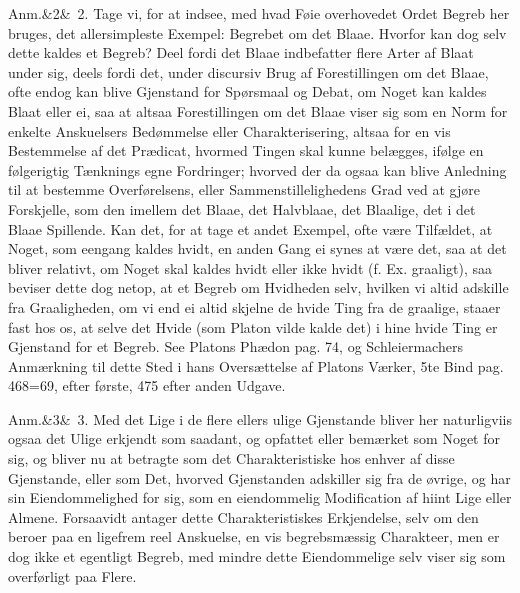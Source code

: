 \documentclass[12pt]{book}
\def\sperr#1{#1}%
\def\textit#1{#1}%
\def\emph#1{#1}%
\newcommand{\sperr}[1]{\textls[180]{#1}}
\newcommand{\anm}[1]{%
  \par\vspace{0.5\baselineskip}%
  \noindent\hspace{\parindent}\sperr{Anm.}\ifx&#1&\else~\textit{#1}.\fi
  \enspace\ignorespaces
}
\newcommand{\opage}[1]{\marginnote{\footnotesize\textit{[#1]}}}
\begin{document}
\anm{2} Tage vi, for at indsee, med hvad Føie overhovedet Ordet Begreb her bruges,
det allersimpleste Exempel: Begrebet om det Blaae. Hvorfor kan dog selv dette kaldes
et Begreb? Deel fordi det Blaae indbefatter flere Arter af Blaat under sig, deels
fordi det, under \emph{discursiv} Brug af Forestillingen om det Blaae, ofte endog
kan blive Gjenstand for Spørsmaal og Debat, om Noget kan kaldes Blaat eller ei, saa
at altsaa Forestillingen om det Blaae viser sig som en \emph{Norm} for enkelte
Anskuelsers Bedømmelse eller Charakterisering, altsaa for en vis Bestemmelse af det
\emph{Prædicat}, hvormed Tingen skal kunne belægges, ifølge en følgerigtig
Tænknings egne Fordringer; hvorved der da ogsaa kan blive Anledning til at bestemme
Overførelsens, eller Sammenstillelighedens Grad ved at gjøre Forskjelle, som den
imellem det Blaae, det Halvblaae, det Blaalige, det i det Blaae Spillende. Kan det,
for at tage et andet Exempel, ofte være Tilfældet, at Noget, som eengang kaldes
hvidt, en anden Gang ei synes at være det, saa at det bliver \emph{relativt}, om
Noget skal kaldes hvidt eller ikke hvidt (f. Ex. graaligt), saa beviser dette
\opage{191} dog netop, at et Begreb om \emph{Hvidheden} selv, hvilken vi altid adskille fra
Graaligheden, om vi end ei altid skjelne de hvide Ting fra de graalige, staaer fast
hos os, at selve \emph{det Hvide} (som Platon vilde kalde det) i hine hvide Ting er
Gjenstand for et Begreb. See Platons Phædon pag. 74, og Schleiermachers Anmærkning
til dette Sted i hans Oversættelse af Platons Værker, 5te Bind pag. 468=69, efter
første, 475 efter anden Udgave.

\anm{3} Med det Lige i de flere ellers ulige Gjenstande bliver her naturligviis
ogsaa det Ulige erkjendt som saadant, og opfattet eller bemærket som Noget for sig,
og bliver nu at betragte som det \emph{Charakteristiske} hos enhver af disse
Gjenstande, eller som Det, hvorved Gjenstanden adskiller sig fra de øvrige, og har
sin Eiendommelighed for sig, som en eiendommelig Modification af hiint Lige eller
Almene. Forsaavidt antager dette \emph{Charakteristiskes} Erkjendelse, selv om den
beroer paa en ligefrem reel Anskuelse, en vis \emph{begrebsmæssig Charakteer}, men
er dog ikke et egentligt Begreb, med mindre dette Eiendommelige selv viser sig som
overførligt paa Flere.
\end{document}
